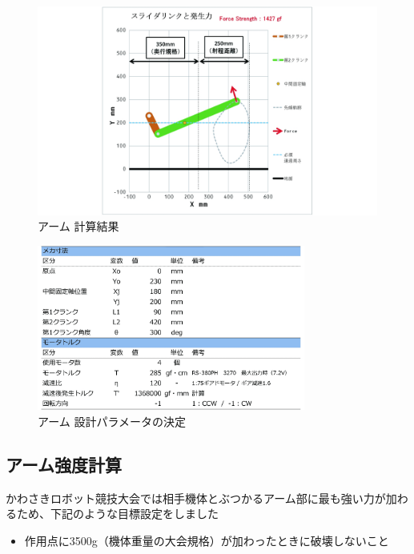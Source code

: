 \begin{figure}[htbp]
\centering
\includegraphics[width=390pt]{fig/fig07_cmyk.jpg}
\caption{アーム 計算結果}
\label{fig07}
\end{figure}

\begin{figure}[htbp]
\centering
\includegraphics[width=250pt]{fig/fig06_cmyk.jpg}
\caption{アーム 設計パラメータの決定}
\label{fig06}
\end{figure}

\clearpage

\subsection{アーム強度計算}\label{ux30a2ux30fcux30e0ux5f37ux5ea6ux8a08ux7b97}

かわさきロボット競技大会では相手機体とぶつかるアーム部に最も強い力が加わるため、下記のような目標設定をしました

\begin{itemize}
\tightlist
\item
  作用点に3500g（機体重量の大会規格）が加わったときに破壊しないこと
\end{itemize}

